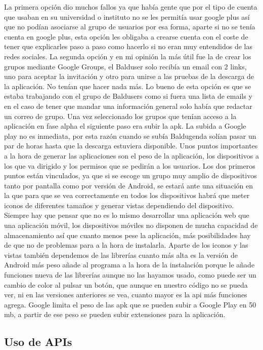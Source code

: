 La primera opción dio muchos fallos ya que había gente que por el tipo de cuenta que usaban en su universidad o instituto no se les permitía usar google plus así que no podían asociarse al grupo de usuarios por esa forma, aparte si no se tenía cuenta en google plus, esta opción les obligaba a crearse cuenta con el coste de tener que explicarles paso a paso como hacerlo si no eran muy entendidos de las redes sociales.
La segunda opción y en mi opinión la más útil fue la de crear los grupos mediante Google Groups, el Balduser solo recibía un email con 2 links, uno para aceptar la invitación y otro para unirse a las pruebas de la descarga de la aplicación. No tenían que hacer nada más. Lo bueno de esta opción es que se estaba trabajando con el grupo de Baldusers como si fuera una lista de emails y en el caso de tener que mandar una información general solo había que redactar un correo de grupo.
Una vez seleccionado los grupos que tenían acceso a la aplicación en fase alpha el siguiente paso era subir la apk.
La subida a Google play no es inmediata, por esta razón cuando se subía Baldugenda solían pasar un par de horas hasta que la descarga estuviera disponible.
Unos puntos importantes a la hora de generar las aplicaciones son el peso de la aplicación, los dispositivos a los que va dirigido y los permisos que se pedirán a los usuarios.
Los dos primeros puntos están vinculados, ya que si se escoge un grupo muy amplio de dispositivos tanto por pantalla como por versión de Android, se estará ante una situación en la que para que se vea correctamente en todos los dispositivos habrá que meter iconos de diferentes tamaños y generar vistas dependiendo del dispositivo.
Siempre hay que pensar que no es lo mismo desarrollar una aplicación web que una aplicación móvil, los dispositivos móviles no disponen de mucha capacidad de almacenamiento así que cuanto menos pese la aplicación, más posibilidades hay de que no de problemas para a la hora de instalarla.
Aparte de los iconos y las vistas también dependemos de las librerías cuanto más alta es la versión de Android más peso añade al programa a la hora de la instalación porque le añade funciones nueva de las librerías aunque no las hayamos usado, como puede ser un cambio de color al pulsar un botón, que aunque en nuestro código no se pueda ver, ni en las versiones anteriores se vea, cuanto mayor es la api más funciones agrega.
Google limita el peso de las apk que se pueden subir a Google Play en 50 mb, a partir de ese peso se pueden subir extensiones para la aplicación.

\subsection{Uso de APIs}
\label{subsecc:Uso de APIs}

